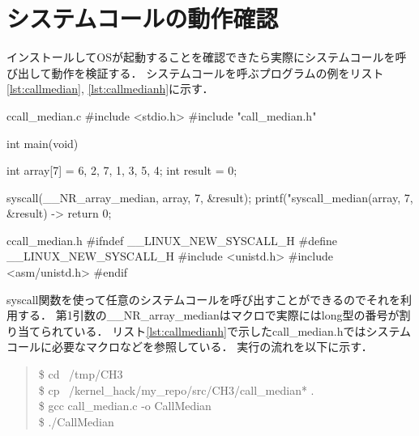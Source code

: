 \section{システムコールの動作確認}
インストールしてOSが起動することを確認できたら実際にシステムコールを呼び出して動作を検証する．
システムコールを呼ぶプログラムの例をリスト\ref{lst:callmedian}, \ref{lst:callmedianh}に示す．
\begin{longlisting}
\begin{myminted}{c}{call\_median.c}
#include <stdio.h>
#include "call_median.h"

int main(void) {
    int array[7] = {6, 2, 7, 1, 3, 5, 4};
    int result = 0;

    syscall(__NR_array_median, array, 7, &result);
    printf("syscall_median(array, 7, &result) -> %
    return 0;
}
\end{myminted}
\caption{medianを呼ぶプログラム}
\label{lst:callmedian}
\end{longlisting}

\begin{longlisting}
\begin{myminted}{c}{call\_median.h}
#ifndef __LINUX_NEW_SYSCALL_H
#define __LINUX_NEW_SYSCALL_H
#include <unistd.h>
#include <asm/unistd.h>
#endif
\end{myminted}
\caption{call\_median.h}
\label{lst:callmedianh}
\end{longlisting}

syscall関数を使って任意のシステムコールを呼び出すことができるのでそれを利用する．
第1引数の\_\_NR\_array\_medianはマクロで実際にはlong型の番号が割り当てられている．\cite{unistd32}
リスト\ref{lst:callmedianh}で示したcall\_median.hではシステムコールに必要なマクロなどを参照している．
実行の流れを以下に示す．

\begin{quote}
\$ cd ~/tmp/CH3 \\
\$ cp ~/kernel\_hack/my\_repo/src/CH3/call\_median* . \\
\$ gcc call\_median.c -o CallMedian \\
\$ ./CallMedian
\end{quote}

